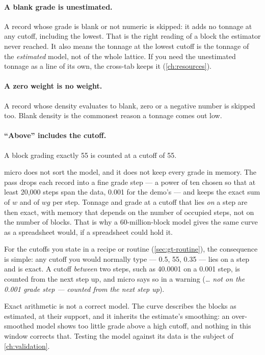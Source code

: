 \paragraph{A blank grade is unestimated.} A record whose grade is blank or not numeric is skipped: it adds no tonnage at any cutoff, including the lowest. That is the right reading of a block the estimator never reached. It also means the tonnage at the lowest cutoff is the tonnage of the \emph{estimated} model, not of the whole lattice. If you need the unestimated tonnage as a line of its own, the cross-tab keeps it (\cref{ch:resources}).

\paragraph{A zero weight is no weight.} A record whose density evaluates to blank, zero or a negative number is skipped too. Blank density is the commonest reason a tonnage comes out low.

\paragraph{“Above” includes the cutoff.} A block grading exactly 55 is counted at a cutoff of 55.

\begin{why}
micro does not sort the model, and it does not keep every grade in memory. The pass drops each record into a fine grade step — a power of ten chosen so that at least 20,000 steps span the data, 0.001 for the demo's  — and keeps the exact sum of $w$ and of $w g$ per step. Tonnage and grade at a cutoff that lies \emph{on} a step are then exact, with memory that depends on the number of occupied steps, not on the number of blocks. That is why a 60-million-block model gives the same curve as a spreadsheet would, if a spreadsheet could hold it.
\end{why}

For the cutoffs you state in a recipe or routine (\cref{sec:gt-routine}), the consequence is simple: any cutoff you would normally type — 0.5, 55, 0.35 — lies on a step and is exact. A cutoff \emph{between} two steps, such as 40.0001 on a 0.001 step, is counted from the next step up, and micro says so in a warning (\emph{… not on the 0.001 grade step — counted from the next step up}).

Exact arithmetic is not a correct model. The curve describes the blocks as estimated, at their support, and it inherits the estimate's smoothing: an over-smoothed model shows too little grade above a high cutoff, and nothing in this window corrects that. Testing the model against its data is the subject of \cref{ch:validation}.

